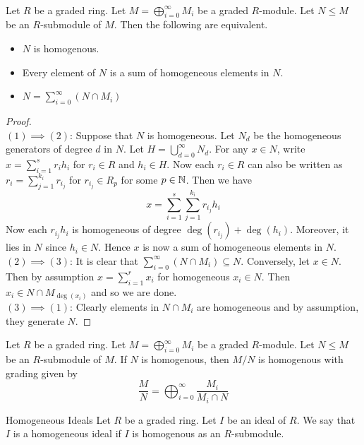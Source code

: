 \documentclass[a4paper]{article}
\begin{document}
\begin{lmm}{}{}\\ Let $R$ be a graded ring. Let $M=\bigoplus_{i=0}^\infty M_i$ be a graded $R$-module. Let $N\leq M$ be an $R$-submodule of $M$. Then the following are equivalent. 
\begin{itemize}
\item $N$ is homogenous. 
\item Every element of $N$ is a sum of homogeneous elements in $N$. 
\item $N=\sum_{i=0}^\infty(N\cap M_i)$
\end{itemize}
\begin{proof}\\
$(1)\implies(2)$: Suppose that $N$ is homogeneous. Let $N_d$ be the homogeneous generators of degree $d$ in $N$. Let $H=\bigcup_{d=0}^\infty N_d$. For any $x\in N$, write $x=\sum_{i=1}^sr_ih_i$ for $r_i\in R$ and $h_i\in H$. Now each $r_i\in R$ can also be written as $r_i=\sum_{j=1}^{k_i}r_{i_j}$ for $r_{i_j}\in R_p$ for some $p\in\mathbb{N}$. Then we have $$x=\sum_{i=1}^s\sum_{j=1}^{k_i}r_{i_j}h_i$$ Now each $r_{i_j}h_i$ is homogeneous of degree $\deg(r_{i_j})+\deg(h_i)$. Moreover, it lies in $N$ since $h_i\in N$. Hence $x$ is now a sum of homogeneous elements in $N$. \\

$(2)\implies (3)$: It is clear that $\sum_{i=0}^\infty(N\cap M_i)\subseteq N$. Conversely, let $x\in N$. Then by assumption $x=\sum_{i=1}^rx_i$ for homogeneous $x_i\in N$. Then $x_i\in N\cap M_{\deg(x_i)}$ and so we are done. \\

$(3)\implies(1)$: Clearly elements in $N\cap M_i$ are homogeneous and by assumption, they generate $N$. 
\end{proof}
\end{lmm}

\begin{prp}{}{} Let $R$ be a graded ring. Let $M=\bigoplus_{i=0}^\infty M_i$ be a graded $R$-module. Let $N\leq M$ be an $R$-submodule of $M$. If $N$ is homogenous, then $M/N$ is homogenous with grading given by $$\frac{M}{N}=\bigoplus_{i=0}^\infty\frac{M_i}{M_i\cap N}$$
\end{prp}

\begin{defn}{Homogeneous Ideals}{} Let $R$ be a graded ring. Let $I$ be an ideal of $R$. We say that $I$ is a homogeneous ideal if $I$ is homogenous as an $R$-submodule. 
\end{defn}
\end{document}
